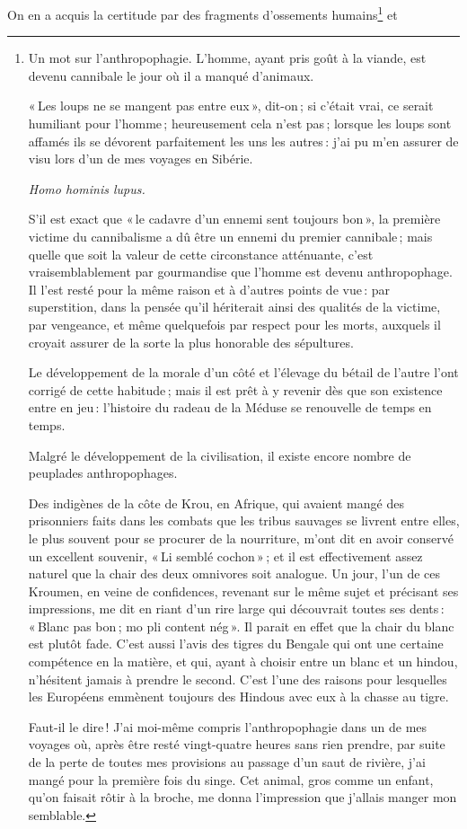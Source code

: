 On en a acquis la certitude par des fragments d'ossements humains\footnote{Un
mot sur l’anthropophagie. L'homme, ayant pris goût à la viande, est devenu
cannibale le jour où il a manqué d'animaux.

« Les loups ne se mangent pas entre eux », dit-on ; si c'était vrai, ce serait
humiliant pour l'homme ; heureusement cela n'est pas ; lorsque les loups sont
affamés ils se dévorent parfaitement les uns les autres : j'ai pu m'en assurer
de visu lors d'un de mes voyages en Sibérie.

\textit{Homo hominis lupus.}

S'il est exact que « le cadavre d'un ennemi sent toujours bon », la première
victime du cannibalisme a dû être un ennemi du premier cannibale ; mais quelle
que soit la valeur de cette circonstance atténuante, c'est vraisemblablement
par gourmandise que l'homme est devenu anthropophage. Il l'est resté pour la
même raison et à d'autres points de vue : par superstition, dans la pensée
qu'il hériterait ainsi des qualités de la victime, par vengeance, et même
quelquefois par respect pour les morts, auxquels il croyait assurer de la sorte
la plus honorable des sépultures.

Le développement de la morale d'un côté et l'élevage du bétail de l'autre l'ont
corrigé de cette habitude ; mais il est prêt à y revenir dès que son existence
entre en jeu : l'histoire du radeau de la Méduse se renouvelle de temps en
temps.

Malgré le développement de la civilisation, il existe encore nombre de
peuplades anthropophages.

Des indigènes de la côte de Krou, en Afrique, qui avaient mangé des prisonniers
faits dans les combats que les tribus sauvages se livrent entre elles, le plus
souvent pour se procurer de la nourriture, m'ont dit en avoir conservé un
excellent souvenir, « Li semblé cochon » ; et il est effectivement assez
naturel que la chair des deux omnivores soit analogue. Un jour, l'un de ces
Kroumen, en veine de confidences, revenant sur le même sujet et précisant ses
impressions, me dit en riant d'un rire large qui découvrait toutes ses dents :
« Blanc pas bon ; mo pli content nég ». Il parait en effet que la chair du blanc
est plutôt fade. C'est aussi l'avis des tigres du Bengale qui ont une certaine
compétence en la matière, et qui, ayant à choisir entre un blanc et un hindou,
n'hésitent jamais à prendre le second. C'est l'une des raisons pour lesquelles
les Européens emmènent toujours des Hindous avec eux à la chasse au tigre.

Faut-il le dire ! J'ai moi-même compris l'anthropophagie dans un de mes voyages
où, après être resté vingt-quatre heures sans rien prendre, par suite de la
perte de toutes mes provisions au passage d'un saut de rivière, j'ai mangé pour
la première fois du singe. Cet animal, gros comme un enfant, qu'on faisait
rôtir à la broche, me donna l'impression que j'allais manger mon semblable.} et
